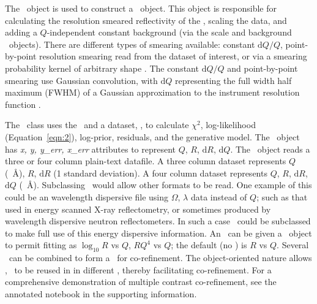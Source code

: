 \documentclass[pdf,preprint]{iucr}
\begin{document}
The \Structure\ object is used to construct a \ReflectModel\ object. This object is responsible for calculating the resolution smeared reflectivity of the \Structure, scaling the data, and adding a $Q$-independent constant background (via the scale and background \Parameter\ objects). There are different types of smearing available: constant $\mathrm{d}Q/Q$, point-by-point resolution smearing read from the dataset of interest, or via a smearing probability kernel of arbitrary shape \cite{Nelson2014}. The constant $\mathrm{d}Q/Q$ and point-by-point smearing use Gaussian convolution, with $\mathrm{d}Q$ representing the full width half maximum (FWHM) of a Gaussian approximation to the instrument resolution function \cite{Well2005}.

The \Objective\ class uses the \ReflectModel\ and a dataset, \DataD, to calculate $\chi^2$, log-likelihood (Equation~\ref{eqn:2}), log-prior, residuals, and the generative model.
The \DataD\ object has \emph{x, y, y\_err, x\_err} attributes to represent $Q$, $R$, $\mathrm{d}R$, $\mathrm{d}Q$. The \DataD\ object reads a three or four column plain-text datafile. A three column dataset represents $Q$ (\si{\per\angstrom}), $R$, $\mathrm{d}R$ (1 standard deviation). A four column dataset represents $Q$, $R$, $\mathrm{d}R$, $\mathrm{d}Q$ (\si{\per\angstrom}). Subclassing \DataD\ would allow other formats to be read. One example of this could be an wavelength dispersive file using $\Omega$, $\lambda$ data instead of $Q$; such as that used in energy scanned X-ray reflectometry, or sometimes produced by wavelength dispersive neutron reflectometers. In such a case \ReflectModel\ could be subclassed to make full use of this energy dispersive information.
An \Objective\ can be given a \Transform\ object to permit fitting as $\log_{10} R$ vs $Q$, $RQ^4$ vs $Q$; the default (no \Transform) is $R$ vs $Q$. Several \Objective\ can be combined to form a \GlobalObjective\ for co-refinement. The object-oriented nature allows \Parameter, \Component\ to be reused in in different \Objective, thereby facilitating co-refinement. For a comprehensive demonstration of multiple contrast co-refinement, see the annotated notebook in the supporting information.
\end{document}
